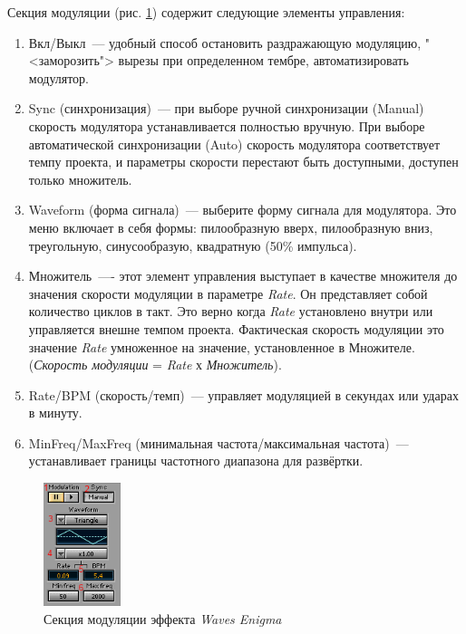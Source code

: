 \documentclass[oneside, final, 14pt]{extreport}
\begin{document}
 Секция модуляции (рис. \ref{pic-enigma-03}) содержит следующие элементы управления:
 \begin{enumerate}
   \item Вкл/Выкл~--- удобный способ остановить раздражающую модуляцию, "<заморозить"> вырезы при определенном тембре, автоматизировать модулятор.
   \item Sync (синхронизация)~--- при выборе ручной синхронизации (Manual) скорость модулятора устанавливается полностью вручную. При выборе автоматической синхронизации (Auto) скорость модулятора соответствует темпу проекта, и параметры скорости перестают быть доступными, доступен только множитель.
   \item Waveform (форма сигнала)~--- выберите форму сигнала для модулятора. Это меню включает в себя формы: пилообразную вверх, пилообразную вниз, треугольную, синусообразую, квадратную (50\% импульса).
   \item Множитель~---- этот элемент управления выступает в качестве множителя до значения скорости модуляции в параметре \emph{Rate}. Он представляет собой количество циклов в такт. Это верно когда \emph{Rate} установлено внутри или управляется внешне темпом проекта. Фактическая скорость модуляции это значение \emph{Rate} умноженное на значение, установленное в Множителе. (\emph{Скорость модуляции} = \emph{Rate} х \emph{Множитель}).
   \item Rate/BPM (скорость/темп)~--- управляет модуляцией в секундах или ударах в минуту.
   \item MinFreq/MaxFreq (минимальная частота/максимальная частота)~--- устанавливает границы частотного диапазона для развёртки.
 \end{enumerate}

\begin{figure}[h!]
  \centering
  \includegraphics[width=0.2\textwidth]{pic-enigma-03}
  \caption{Секция модуляции эффекта \emph{Waves Enigma}}
  \label{pic-enigma-03}
\end{figure}
\end{document}
